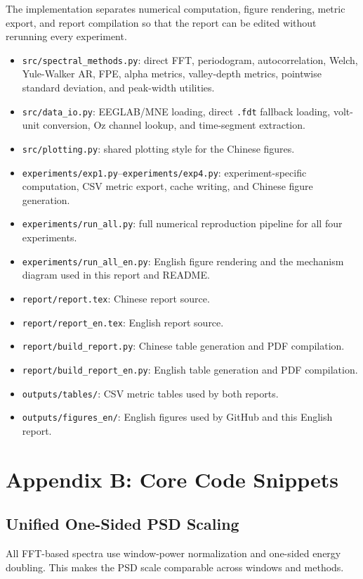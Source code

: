 \documentclass[11pt]{article}
\begin{document}
The implementation separates numerical computation, figure rendering, metric export, and report compilation so that the report can be edited without rerunning every experiment.

\begin{itemize}
  \item \texttt{src/spectral\_methods.py}: direct FFT, periodogram, autocorrelation, Welch, Yule-Walker AR, FPE, alpha metrics, valley-depth metrics, pointwise standard deviation, and peak-width utilities.
  \item \texttt{src/data\_io.py}: EEGLAB/MNE loading, direct \texttt{.fdt} fallback loading, volt-unit conversion, Oz channel lookup, and time-segment extraction.
  \item \texttt{src/plotting.py}: shared plotting style for the Chinese figures.
  \item \texttt{experiments/exp1.py}--\texttt{experiments/exp4.py}: experiment-specific computation, CSV metric export, cache writing, and Chinese figure generation.
  \item \texttt{experiments/run\_all.py}: full numerical reproduction pipeline for all four experiments.
  \item \texttt{experiments/run\_all\_en.py}: English figure rendering and the mechanism diagram used in this report and README.
  \item \texttt{report/report.tex}: Chinese report source.
  \item \texttt{report/report\_en.tex}: English report source.
  \item \texttt{report/build\_report.py}: Chinese table generation and PDF compilation.
  \item \texttt{report/build\_report\_en.py}: English table generation and PDF compilation.
  \item \texttt{outputs/tables/}: CSV metric tables used by both reports.
  \item \texttt{outputs/figures\_en/}: English figures used by GitHub and this English report.
\end{itemize}

\section{Appendix B: Core Code Snippets}

\subsection{Unified One-Sided PSD Scaling}
All FFT-based spectra use window-power normalization and one-sided energy doubling. This makes the PSD scale comparable across windows and methods.
\end{document}
